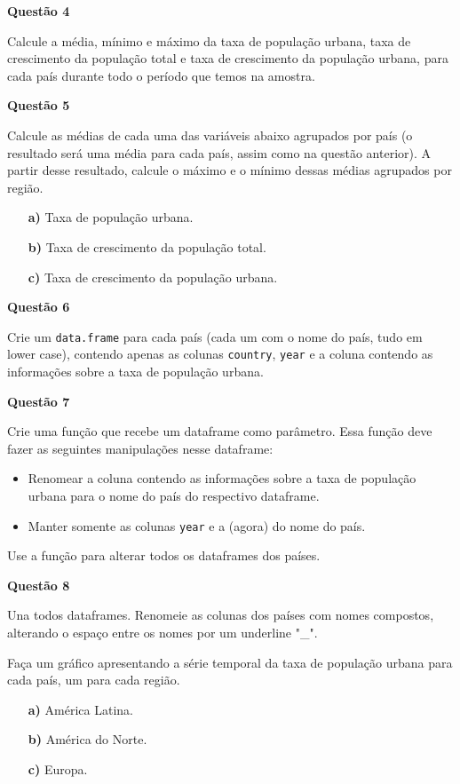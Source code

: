\documentclass[12pt, a4paper]{article}
\begin{document}
\textbf{Questão 4}

Calcule a média, mínimo e máximo da taxa de população urbana, taxa de crescimento da população total e taxa de crescimento da população urbana, para cada país durante todo o período que temos na amostra.



\textbf{Questão 5}

Calcule as médias de cada uma das variáveis abaixo agrupados por país (o resultado será uma média para cada país, assim como na questão anterior). A partir desse resultado, calcule o máximo e o mínimo dessas médias agrupados por região.

\begin{itemize}
	\item[\textbf{a)}] Taxa de população urbana.
	
	\item[\textbf{b)}] Taxa de crescimento da população total.
	
	\item[\textbf{c)}] Taxa de crescimento da população urbana.
\end{itemize}



\textbf{Questão 6}

Crie um \texttt{data.frame} para cada país (cada um com o nome do país, tudo em lower case), contendo apenas as colunas \texttt{country}, \texttt{year} e a coluna contendo as informações sobre a taxa de população urbana.



\textbf{Questão 7}

Crie uma função que recebe um dataframe como parâmetro. Essa função deve fazer as seguintes manipulações nesse dataframe:

\begin{itemize}
	\item Renomear a coluna contendo as informações sobre a taxa de população urbana para o nome do país do respectivo dataframe.
	\item Manter somente as colunas \texttt{year} e a (agora) do nome do país.
\end{itemize}

Use a função para alterar todos os dataframes dos países.



\textbf{Questão 8}

Una todos dataframes. Renomeie as colunas dos países com nomes compostos, alterando o espaço entre os nomes por um underline "\_". 

Faça um gráfico apresentando a série temporal da taxa de população urbana para cada país, um para cada região.

\begin{itemize}
	\item[\textbf{a)}] América Latina.
	
	\item[\textbf{b)}] América do Norte.
	
	\item[\textbf{c)}] Europa.
	
\end{itemize}

	
	
\end{document}
